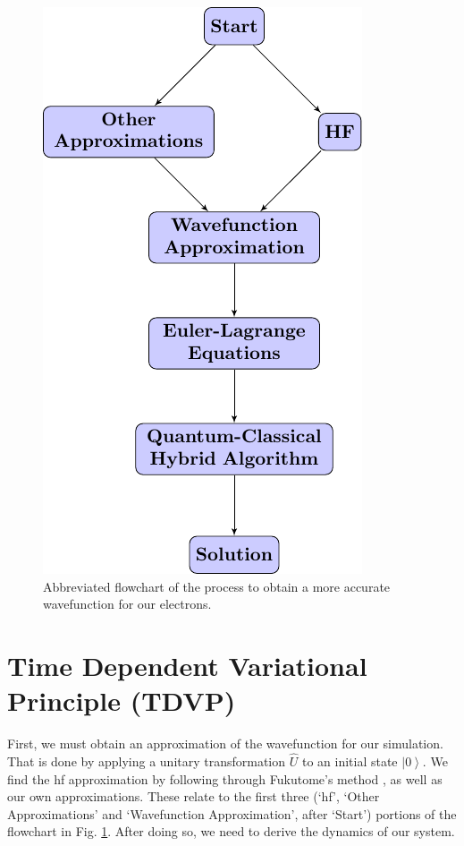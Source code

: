 \documentclass{aux/ttuthes2007}
\newcommand{\ket}[1]{\ensuremath{\left|#1\right\rangle}}
\begin{document}
\clearpage
\begin{figure}[hb!]
	\centering
  \includegraphics[width=.7\linewidth]{flowcharts/flowchart1.pdf}
  \caption{Abbreviated flowchart of the process to obtain a more accurate wavefunction for our electrons.}
  \label{fig:flowchart1}
\end{figure}

\section{\textbf{Time Dependent Variational Principle (TDVP)}}\label{sec:tdvp}
First, we must obtain an approximation of the wavefunction for our simulation. That is done by applying a unitary transformation $\hat U$ to an initial state $\ket 0$.
We find the \gls {hf} approximation by following through Fukutome's method , as well as our own approximations. These relate to the first three (`\gls{hf}', `Other Approximations' and `Wavefunction Approximation', after `Start') portions of the flowchart in Fig. \ref{fig:flowchart1}. After doing so, we need to derive the dynamics of our system.
\end{document}
